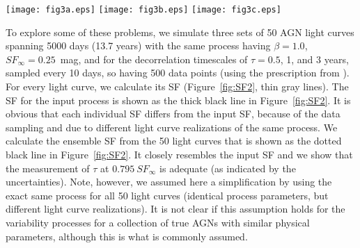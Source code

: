 \documentclass[twocolumn]{aastex6}
\begin{document}
\begin{figure*}
\centering
\texttt{[image: fig3a.eps]}
\texttt{[image: fig3b.eps]}
\texttt{[image: fig3c.eps]}
\caption{Structure functions for 50 simulated AGN light curves (gray lines) for the same DRW process with $SF_\infty=0.25$ mag and $\tau_{\rm INPUT}=0.5$ year (left panel),
1 year (middle), and 3 years (right). The input SF for the DRW process is shown as the black solid line and the ensemble SF is shown as the black dotted line. 
\cite{2010MNRAS.404..931E} already shown that individual SFs ``suffer'' from wiggles and/or breaks that are due to the light curve length and cadence. Infinitely long and well-sampled light curves
would asymptotically produce the input SFs. A similar effect occurs when one merges a number of individual SFs (the ensemble SF),
however, it is not clear if AGNs with similar physical parameters should have the same process leading to variability (although this is commonly assumed). 
The measured decorrelation timescale $\tau_{\rm OUTPUT}$ is 
estimated at $0.795~SF_\infty$ (marked with dot) and can be well-determined from ensemble SFs, provided the data are sufficiently long to constrain $SF_\infty$.
The horizontal error bar shows the asymmetric one side dispersions, while the reported uncertainties are these dispersions divided by $\sqrt{25}$ (for each side separately).}
\label{fig:SF2}
\vspace{0.1cm}
\end{figure*}

To explore some of these problems, we simulate three sets of 50 AGN light curves spanning 5000 days (13.7 years) with the same process having $\beta=1.0$, $SF_\infty=0.25$~mag, 
and for the decorrelation timescales of $\tau=0.5$, 1, and 3 years,
sampled every 10 days, so having 500 data points (using the prescription from \citealt{2010ApJ...708..927K}). 
For every light curve, we calculate its SF (Figure~\ref{fig:SF2}, thin gray lines).
The SF for the input process is shown as the thick black line in Figure~\ref{fig:SF2}. It is obvious that each individual SF
differs from the input SF, because of the data sampling and due to different light curve realizations of the same process. We calculate the ensemble SF
from the 50 light curves that is shown as the dotted black line in Figure~\ref{fig:SF2}. It closely resembles the input SF and we show
that the measurement of $\tau$ at $0.795~SF_\infty$ is adequate (as indicated by the uncertainties). 
Note, however, we assumed here a simplification by using the exact same process for all 50 light curves (identical process parameters, but different light curve realizations).
It is not clear if this assumption holds for the variability processes for a collection of true AGNs with similar physical parameters,
although this is what is commonly assumed. 
\end{document}
